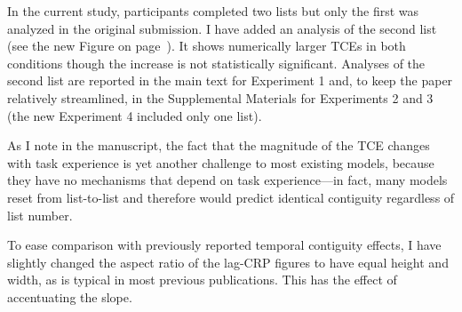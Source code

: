 \documentclass[12pt]{article}
\begin{document}
\begin{enumerate}
	In the current study, participants completed two lists but only the first was analyzed in the original submission. I have added an analysis of the second list (see the new Figure on page~\pageref{TODO-6}). It shows numerically larger TCEs in both conditions though the increase is not statistically significant. Analyses of the second list are reported in the main text for Experiment 1 and, to keep the paper relatively streamlined, in the Supplemental Materials for Experiments 2 and 3 (the new Experiment 4 included only one list).

	As I note in the manuscript, the fact that the magnitude of the TCE changes with task experience is yet another challenge to most existing models, because they have no mechanisms that depend on task experience---in fact, many models reset from list-to-list and therefore would predict identical contiguity regardless of list number.

	To ease comparison with previously reported temporal contiguity effects, I have slightly changed the aspect ratio of the lag-CRP figures to have equal height and width, as is typical in most previous publications. This has the effect of accentuating the slope. 



\end{enumerate}
\end{document}
